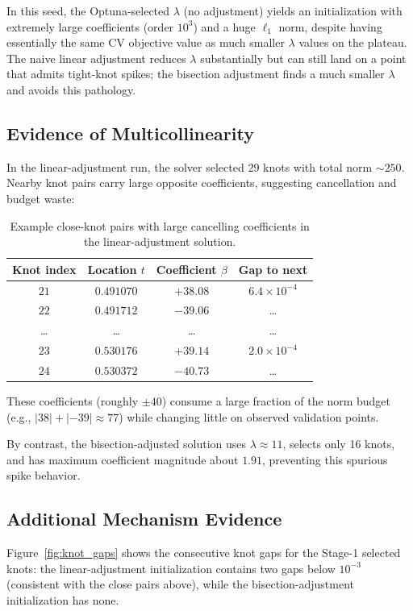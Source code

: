 \documentclass[11pt]{article}
\begin{document}
In this seed, the Optuna-selected $\lambda$ (no adjustment) yields an initialization with extremely large coefficients (order $10^3$) and a huge $\ell_1$ norm, despite having essentially the same CV objective value as much smaller $\lambda$ values on the plateau. The naive linear adjustment reduces $\lambda$ substantially but can still land on a point that admits tight-knot spikes; the bisection adjustment finds a much smaller $\lambda$ and avoids this pathology.

\subsection{Evidence of Multicollinearity}
In the linear-adjustment run, the solver selected 29 knots with total norm $\sim 250$. Nearby knot pairs carry large opposite coefficients, suggesting cancellation and budget waste:

\begin{table}[H]
    \centering
    \begin{tabular}{cccc}
        \toprule
        Knot index & Location $t$ & Coefficient $\beta$ & Gap to next \\
        \midrule
        $21$ & $0.491070$ & $+38.08$ & $6.4 \times 10^{-4}$ \\
        $22$ & $0.491712$ & $-39.06$ & \dots \\
        \dots & \dots & \dots & \dots \\
        $23$ & $0.530176$ & $+39.14$ & $2.0 \times 10^{-4}$ \\
        $24$ & $0.530372$ & $-40.73$ & \dots \\
        \bottomrule
    \end{tabular}
    \caption{Example close-knot pairs with large cancelling coefficients in the linear-adjustment solution.}
    \label{tab:coef_pairs}
\end{table}

These coefficients (roughly $\pm 40$) consume a large fraction of the norm budget (e.g., $|38| + |-39| \approx 77$) while changing little on observed validation points.

By contrast, the bisection-adjusted solution uses $\lambda \approx 11$, selects only 16 knots, and has maximum coefficient magnitude about $1.91$, preventing this spurious spike behavior.

\subsection{Additional Mechanism Evidence}
Figure~\ref{fig:knot_gaps} shows the consecutive knot gaps for the Stage-1 selected knots: the linear-adjustment initialization contains two gaps below $10^{-3}$ (consistent with the close pairs above), while the bisection-adjustment initialization has none.
\end{document}

